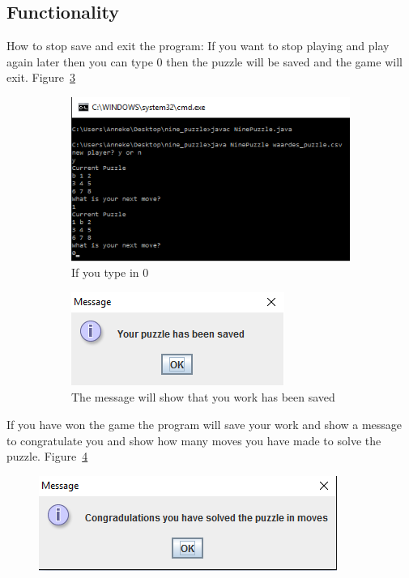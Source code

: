 \documentclass[10pt]{article}
\begin{document}
\subsection*{Functionality}
How to stop save and exit the program:
If you want to stop playing and play again later then you can type 0 then the puzzle will be saved and the game will exit. Figure~\ref{2}
\begin{figure}[b!]
    \centering
    \begin{subfigure}[b]{0.5\textwidth}
        \centering
        \includegraphics[scale=0.8]{./Prente/prent4.png}
        \caption{If you type in 0}
        \label{prent4}
    \end{subfigure}%
 
    \begin{subfigure}[b]{0.5\textwidth}
        \centering
        \includegraphics[scale=0.8]{./Prente/prent5.png}
        \caption{The message will show that you work has been saved}
        \label{prent5}
    \end{subfigure}
    \caption{\label{2}}
   \end{figure}
   
If you have won the game the program will save your work and show a message to congratulate you and show how many moves you have made to solve the puzzle. Figure~\ref{prent6} 
\begin{figure}
\centering
\includegraphics[scale=0.8]{./Prente/prent6.png}
\caption{}
\label{prent6}
\end{figure}
\end{document}
